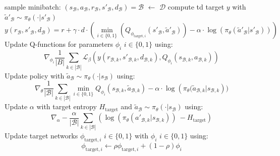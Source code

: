 \begin{algorithm}
\begin{algorithmic}
			\State{} sample minibatch: $(s_\mathcal{B}, a_\mathcal{B}, r_\mathcal{B}, s'_\mathcal{B}, d_\mathcal{B}) = \mathcal{B}$ $\leftarrow$ $\mathcal{D}$ 
			\State{} compute td target $y$ with $\tilde{a}'_\mathcal{B} \sim \pi_\theta(\cdot|s'_\mathcal{B})$
			\begin{equation}\label{eqn:td-target-batch}
				y(r_\mathcal{B}, s'_\mathcal{B}, d_\mathcal{B}) = r + \gamma \cdot d \cdot \left(\min_{i\in\{0, 1\}}\left(Q_{\phi_{\text{target}, i}}(s'_\mathcal{B}, \tilde{a}'_\mathcal{B})\right) - \alpha \cdot \log\left(\pi_\theta(\tilde{a}'_\mathcal{B}|s'_\mathcal{B})\right)\right)
			\end{equation}
			\State{} Update Q-functions for parameters $\phi_i$ $i \in \{0, 1\}$ using:
			\begin{equation}\label{eqn:q-update}
				\nabla_{\phi_i} \frac{1}{|B|} \sum_{k \in |\mathcal{B}|}\mathcal{L}_\beta\left(y(r_{\mathcal{B}, k}, s'_{\mathcal{B}, k}, d_{\mathcal{B}, k}), Q_{\phi_i}(s_{\mathcal{B}, k}, a_{\mathcal{B}, k})\right)    
			\end{equation}
			\State{} Update policy with $\tilde{a}_\mathcal{B} \sim \pi_\theta(\cdot|s_\mathcal{B})$ using:
			\begin{equation}\label{eqn:policy-update}
			   \nabla_{\theta} \frac{1}{|\mathcal{B}|}\sum_{k \in |\mathcal{B}|}\min_{i\in\{0, 1\}}Q_{\phi_i}(s_{\mathcal{B}, k}, \tilde{a}_{\mathcal{B}, k}) - \alpha \cdot \log\left(\pi_\theta(\tilde{a}_{\mathcal{B}, k}|s_{\mathcal{B}, k}\right))
			\end{equation}
			\State{} Update $\alpha$ with target entropy $H_\text{target}$ and $\tilde{a}_\mathcal{B} \sim \pi_\theta(\cdot|s_\mathcal{B})$ using:
			\begin{equation*}
				\nabla_\alpha -\frac{\alpha}{|\mathcal{B}|} \sum_{k \in |\mathcal{B}|} \left(\log\left(\pi_\theta(a'_{\mathcal{B}, k}|s_{\mathcal{B}, k})\right)\ - H_\text{target}\right)
			\end{equation*}
			\State{} Update target networks $\phi_{\text{target}, i}$ $i \in \{0, 1\}$ with $\phi_i$ $i \in \{0, 1\}$ using:
			\begin{equation*}
				\phi_{\text{target}, i} \leftarrow \rho \phi_{\text{target}, i} + (1 - \rho) \phi_i
			\end{equation*}
			\EndFor{}
			\EndIf{}
			\EndFor{}
	\end{algorithmic}
\end{algorithm}

